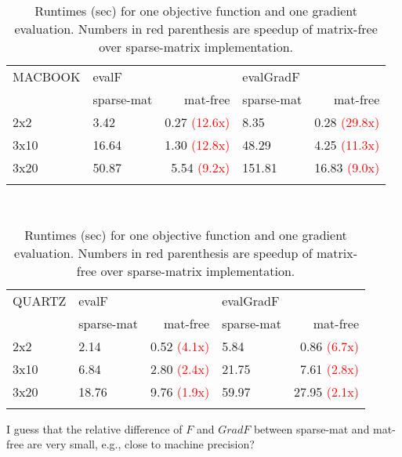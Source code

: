 \documentclass[letterpaper]{article}
\newcommand{\YC}[1]{{\textcolor{Bronze}{#1}}}
\begin{document}
\begin{table}[h]
  \begin{tabular}{l|lr|lr}
    \hline\noalign{\smallskip}
     MACBOOK    & evalF &    &  evalGradF &\\
                & sparse-mat & mat-free & sparse-mat& mat-free  \\
    \noalign{\smallskip}\hline\noalign{\smallskip}
    2x2  & 3.42   & 0.27 \textcolor{red}{(12.6x)}  & 8.35  &  0.28 \textcolor{red}{(29.8x)}  \\
    3x10 & 16.64  & 1.30  \textcolor{red}{(12.8x)} & 48.29 &  4.25 \textcolor{red}{(11.3x)}  \\
    3x20 &  50.87 & 5.54  \textcolor{red}{(9.2x)}  & 151.81 & 16.83 \textcolor{red}{ (9.0x)} \\
    \noalign{\smallskip}\hline
  \end{tabular}\\[2ex]
  \begin{tabular}{l|lr|lr}
    \hline\noalign{\smallskip}
     QUARTZ  & evalF &    &  evalGradF & \\
            & sparse-mat & mat-free & sparse-mat& mat-free  \\
    \noalign{\smallskip}\hline\noalign{\smallskip}
    2x2  &  2.14 & 0.52  \textcolor{red}{ (4.1x)} &  5.84 & 0.86 \textcolor{red}{ (6.7x)}  \\
    3x10 &  6.84 & 2.80  \textcolor{red}{ (2.4x)} & 21.75 & 7.61 \textcolor{red}{(2.8x)}   \\
    3x20 & 18.76 & 9.76  \textcolor{red}{(1.9x)}  & 59.97 & 27.95 \textcolor{red}{(2.1x)}  \\
    \noalign{\smallskip}\hline
  \end{tabular}
  \caption{Runtimes (sec) for one objective function and one gradient
  evaluation. Numbers in red parenthesis are speedup of matrix-free over
  sparse-matrix implementation.}
  \label{tab:runtime_qvsm} 
\end{table}
\YC{I guess that the relative difference of $F$ and $GradF$ between sparse-mat
and mat-free are very small, e.g., close to machine precision?}
\end{document}

